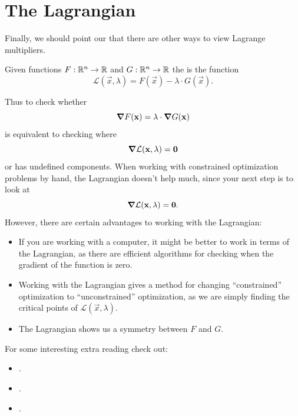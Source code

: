 \documentclass{ximera}
\begin{document}
\section{The Lagrangian}

Finally, we should point our that there are other ways to view
Lagrange multipliers.

\begin{definition}
  Given functions $F:\mathbb R^n\to\mathbb R$ and $G:\mathbb R^n\to\mathbb R$ the  is the function
  \[
  \mathcal{L}(\vec{x},\lambda) = F(\vec{x}) - \lambda \cdot G(\vec{x}).
  \]
\end{definition}

Thus to check whether
\[
\boldsymbol\nabla F(\mathbf{x}) = \lambda \cdot \boldsymbol\nabla G(\mathbf{x})
\]
is equivalent to checking where
\[
\boldsymbol\nabla \mathcal{L}(\mathbf{x},\lambda) = \mathbf{0}
\]
or has undefined components. When working with constrained
optimization problems by hand, the Lagrangian doesn't help much, since
your next step is to look at 
\[
\boldsymbol\nabla \mathcal{L}(\mathbf{x},\lambda) = \mathbf{0}.
\]
However, there are certain advantages to working with the Lagrangian:
\begin{itemize}
\item If you are working with a computer, it might be better to work
  in terms of the Lagrangian, as there are efficient algorithms for
  checking when the gradient of the function is zero.
\item Working with the Lagrangian gives a method for changing
  ``constrained'' optimization to ``unconstrained'' optimization, as
  we are simply finding the critical points of
  $\mathcal{L}(\vec{x},\lambda)$.
\item The Lagrangian shows us a symmetry between $F$ and $G$.
\end{itemize}

For some interesting extra reading check out:
\begin{itemize}
\item {}.
\item {}.
\item {}.
\end{itemize}
\end{document}
